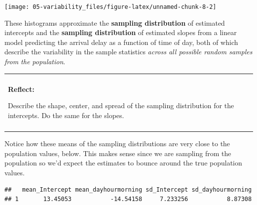 \documentclass[
]{book}
\newenvironment{Shaded}{\begin{snugshade}}{\end{snugshade}}
\newcommand{\CommentTok}[1]{\textcolor[rgb]{0.56,0.35,0.01}{\textit{#1}}}
\newcommand{\DataTypeTok}[1]{\textcolor[rgb]{0.13,0.29,0.53}{#1}}
\newcommand{\KeywordTok}[1]{\textcolor[rgb]{0.13,0.29,0.53}{\textbf{#1}}}
\newcommand{\NormalTok}[1]{#1}
\newcommand{\OperatorTok}[1]{\textcolor[rgb]{0.81,0.36,0.00}{\textbf{#1}}}
\newcommand{\StringTok}[1]{\textcolor[rgb]{0.31,0.60,0.02}{#1}}
\newenvironment{reflect}
{
    \begin{center}
    
    \begin{tabular}{|p{0.8\textwidth}|}
    \rowcolor{LightBlue}
    \hline\\
    \rowcolor{LightBlue}
    \textbf{Reflect:}
}
{
    \\\rowcolor{LightBlue}
    \\\hline
    \end{tabular} 
    \end{center}
}
\begin{document}
\begin{center}\texttt{[image: 05-variability\_files/figure-latex/unnamed-chunk-8-2]} \end{center}

These histograms approximate the \textbf{sampling distribution} of estimated intercepts and the \textbf{sampling distribution} of estimated slopes from a linear model predicting the arrival delay as a function of time of day, both of which describe the variability in the sample statistics \emph{across all possible random samples from the population}.

\begin{reflect}
Describe the shape, center, and spread of the sampling distribution for
the intercepts. Do the same for the slopes.
\end{reflect}

Notice how these means of the sampling distributions are very close to the population values, below. This makes sense since we are sampling from the population so we'd expect the estimates to bounce around the true population values.

\begin{Shaded}
\end{Shaded}

\begin{verbatim}
##   mean_Intercept mean_dayhourmorning sd_Intercept sd_dayhourmorning
## 1       13.45053           -14.54158     7.233256           8.87308
\end{verbatim}

\begin{Shaded}
\end{Shaded}
\end{document}
